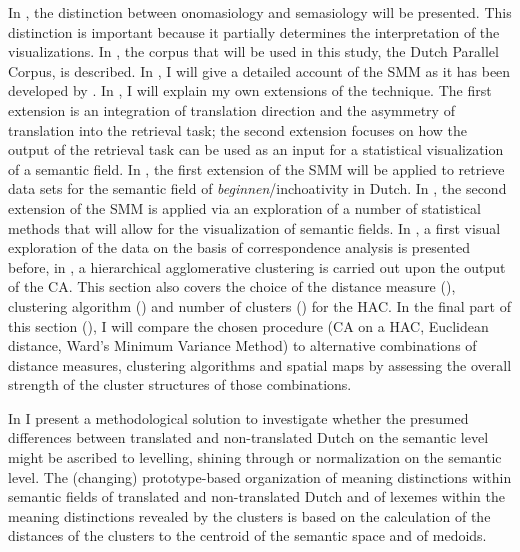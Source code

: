 In , the distinction between onomasiology and semasiology will be presented. This distinction is important because it partially determines the interpretation of the visualizations. In , the corpus that will be used in this study, the Dutch Parallel Corpus, is described. In , I will give a detailed account of the SMM as it has been developed by \citet{johansson_translational_1998,langemets_translations_2005}. In , I will explain my own extensions of the technique. The first extension is an integration of translation direction and the asymmetry of translation into the retrieval task; the second extension focuses on how the output of the retrieval task can be used as an input for a statistical visualization of a semantic field. In , the first extension of the SMM will be applied to retrieve data sets for the semantic field of \textit{beginnen}/inchoativity in Dutch. In , the second extension of the SMM is applied via an exploration of a number of statistical methods that will allow for the visualization of semantic fields. In , a first visual exploration of the data on the basis of correspondence analysis is presented before, in , a hierarchical agglomerative clustering is carried out upon the output of the CA. This section also covers the choice of the distance measure (), clustering algorithm () and number of clusters () for the HAC. In the final part of this section (), I will compare the chosen procedure (CA on a HAC, Euclidean distance, Ward’s Minimum Variance Method) to alternative combinations of distance measures, clustering algorithms and spatial maps by assessing the overall strength of the cluster structures of those combinations.

In  I present a methodological solution to investigate whether the presumed differences between translated and non-translated Dutch on the semantic level might be ascribed to levelling, shining through or normalization on the semantic level. The (changing) prototype-based organization of meaning distinctions within semantic fields of translated and non-translated Dutch and of lexemes within the meaning distinctions revealed by the clusters is based on the calculation of the distances of the clusters to the centroid of the semantic space and of medoids.

